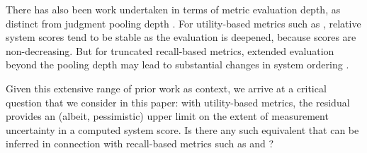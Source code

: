 There has also been work undertaken in terms of metric evaluation
depth, as distinct from judgment pooling depth {\citep{wmz10evia}}.
For utility-based metrics such as {\rbp}, relative system scores tend
to be stable as the evaluation is deepened, because scores are
non-decreasing.
But for truncated recall-based metrics, extended evaluation beyond
the pooling depth may lead to substantial changes in system ordering
{\citep{lmc16irj}}.


Given this extensive range of prior work as context, we arrive at a
critical question that we consider in this paper: with utility-based
metrics, the residual provides an (albeit, pessimistic) upper limit
on the extent of measurement uncertainty in a computed system score.
Is there any such equivalent that can be inferred in connection with
recall-based metrics such as {\ap} and {\ndcg}?
